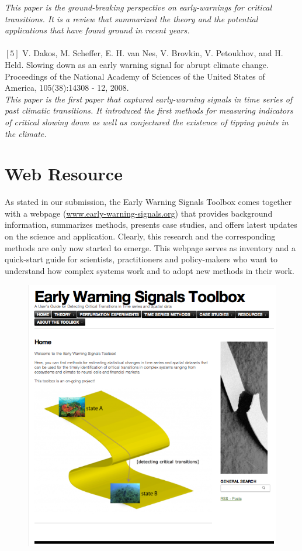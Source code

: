 \documentclass[12pt,a4paper,final]{article}
\begin{document}
\begin{doublespacing}
\textit{This paper is the ground-breaking perspective on early-warnings for critical transitions. It is a review that summarized the theory and the potential applications that have found ground in recent years.}\\
\\
$[5]$ V. Dakos, M. Scheffer, E. H. van Nes, V. Brovkin, V. Petoukhov, and H. Held. Slowing down as an early warning signal for abrupt climate change. Proceedings of the National Academy
of Sciences of the United States of America, 105(38):14308 - 12, 2008.\\
\textit{This paper is the first paper that captured early-warning signals in time series of past climatic transitions. It introduced the first methods for measuring indicators of critical slowing down as well as conjectured the existence of tipping points in the climate.}

\newpage
\section{Web Resource}
As stated in our submission, the Early Warning Signals Toolbox comes together with a webpage (\url{www.early-warning-signals.org}) that provides background information, summarizes methods, presents case studies, %
and offers latest updates on the science and application.%
Clearly, this research and the corresponding methods are only now started to emerge. This webpage serves as inventory and a quick-start guide for scientists, practitioners and policy-makers who want to understand how complex systems work and to adopt new methods in their work.

\begin{figure}[ht]
\includegraphics[scale=0.8]{webpage_ews_home.png}
\end{figure}


\end{doublespacing}
\end{document}
